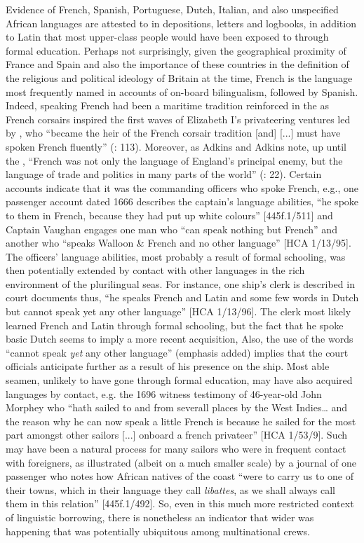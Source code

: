 Evidence of French, Spanish, Portuguese, Dutch, Italian, and also unspecified African languages are attested to in depositions, letters and logbooks, in addition to Latin that most upper-class people would have been exposed to through formal education. Perhaps not surprisingly, given the geographical proximity of France and Spain and also the importance of these countries in the definition of the religious and political ideology of Britain at the time, French is the language most frequently named in accounts of on-board bilingualism, followed by Spanish. Indeed, speaking French had been a maritime tradition reinforced in the  as French corsairs inspired the first waves of Elizabeth I’s privateering ventures led by , who “became the heir of the French corsair tradition [and] [...] must have spoken French fluently” (\citealt{Bicheno2012}: 113). Moreover, as Adkins and Adkins note, up until the , “French was not only the language of England’s principal enemy, but the language of trade and politics in many parts of the world” (\citeyear*{AdkinsAdkins2008}: 22). Certain accounts indicate that it was the commanding officers who spoke French, e.g., one passenger account dated 1666 describes the captain’s language abilities, “he spoke to them in French, because they had put up white colours” [445f.1/511] and Captain Vaughan engages one man who “can speak nothing but French” and another who “speaks Walloon \& French and no other language” [HCA 1/13/95]. The officers’ language abilities, most probably a result of formal schooling, was then potentially extended by contact with other languages in the rich environment of the plurilingual seas. For instance, one ship’s clerk is described in court documents thus, “he speaks French and Latin and some few words in Dutch but cannot speak yet any other language” [HCA 1/13/96]. The clerk most likely learned French and Latin through formal schooling, but the fact that he spoke basic Dutch seems to imply a more recent acquisition, Also, the use of the words “cannot speak \textit{yet} any other language” (emphasis added) implies that the court officials anticipate further  as a result of his presence on the ship. Most able seamen, unlikely to have gone through formal education, may have also acquired languages by contact, e.g. the 1696 witness testimony of 46-year-old John Morphey who “hath sailed to and from severall places by the West Indies… and the reason why he can now speak a little French is because he sailed for the most part amongst other sailors [...] onboard a french privateer” [HCA 1/53/9]. Such  may have been a natural process for many sailors who were in frequent contact with foreigners, as illustrated (albeit on a much smaller scale) by a journal of one passenger who notes how African natives of the coast “were to carry us to one of their towns, which in their language they call \textit{libattes}, as we shall always call them in this relation” [445f.1/492].  So, even in this much more restricted context of linguistic borrowing, there is nonetheless an indicator that wider  was happening that was potentially ubiquitous among multinational crews. 

